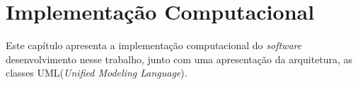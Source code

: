 \chapter{Implementação Computacional}
Este capítulo apresenta a implementação computacional do \textit{software} desenvolvimento nesse trabalho, junto com uma apresentação da arquitetura, as classes UML(\textit{Unified Modeling Language}).